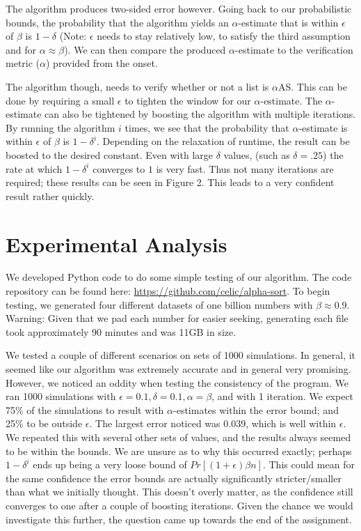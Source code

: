 \documentclass[11pt]{article}
\begin{document}
The algorithm produces two-sided error however. Going back to our probabilistic bounds, the probability that the algorithm yields an $\alpha$-estimate that is within $\epsilon$ of $\beta$ is $1 - \delta$ (Note: $\epsilon$ needs to stay relatively low, to satisfy the third assumption and for $\alpha \approx \beta$). We can then compare the produced $\alpha$-estimate to the verification metric ($\alpha$) provided from the onset. 

The algorithm though, needs to verify whether or not a list is $\alpha$AS. This can be done by requiring a small $\epsilon$ to tighten the window for our $\alpha$-estimate. The $\alpha$-estimate can also be tightened by boosting the algorithm with multiple iterations. By running the algorithm $i$ times, we see that the probability that $\alpha$-estimate is within $\epsilon$ of $\beta$ is $1 - \delta^i$. Depending on the relaxation of runtime, the result can be boosted to the desired constant. Even with large $\delta$ values, (such as $\delta = .25$) the rate at which $1 - \delta^i$ converges to $1$ is very fast. Thus not many iterations are required; these results can be seen in Figure 2. This leads to a very confident result rather quickly.

\section{Experimental Analysis}

We developed Python code to do some simple testing of our algorithm. The code repository can be found here: \url{https://github.com/celic/alpha-sort}. To begin testing, we generated four different datasets of one billion numbers with $\beta \approx 0.9$. Warning: Given that we pad each number for easier seeking, generating each file took approximately 90 minutes and was 11GB in size. 

We tested a couple of different scenarios on sets of 1000 simulations. In general, it seemed like our algorithm was extremely accurate and in general very promising. However, we noticed an oddity when testing the consistency of the program. We ran 1000 simulations with $\epsilon=0.1, \delta=0.1, \alpha=\beta$, and with 1 iteration. We expect 75\% of the simulations to result with $\alpha$-estimates within the error bound; and 25\% to be outside $\epsilon$. The largest error noticed was $0.039$, which is well within $\epsilon$. We repeated this with several other sets of values, and the results always seemed to be within the bounds. We are unsure as to why this occurred exactly; perhaps $1 - \delta^i$ ends up being a very loose bound of $Pr[(1+\epsilon)\beta n]$. This could mean for the same confidence the error bounds are actually significantly stricter/smaller than what we initially thought. This doesn't overly matter, as the confidence still converges to one after a couple of boosting iterations. Given the chance we would investigate this further, the question came up towards the end of the assignment.
\end{document}
